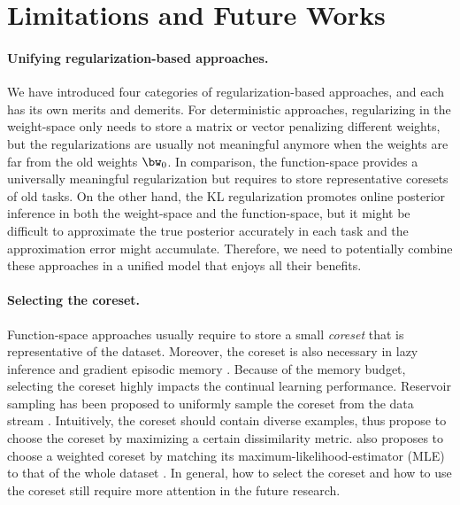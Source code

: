 \section{Limitations and Future Works}

\paragraph{Unifying regularization-based approaches.}
We have introduced four categories of regularization-based approaches, and each has its own merits and demerits. 
For deterministic approaches, regularizing in the weight-space only needs to store a matrix or vector penalizing different weights, but the regularizations are usually not meaningful anymore when the weights are far from the old weights $\bw_0$. In comparison, the function-space provides a universally meaningful regularization but requires to store representative coresets of old tasks. On the other hand, the KL regularization promotes online posterior inference in both the weight-space and the function-space, but it might be difficult to approximate the true posterior accurately in each task and the approximation error might accumulate. Therefore, we need to potentially combine these approaches in a unified model that enjoys all their benefits. 

\paragraph{Selecting the coreset.} Function-space approaches \citep{benjamin2018measuring, buzzega2020dark, rebuffi2017icarl} usually require to store a small \emph{coreset} that is representative of the dataset. Moreover, the coreset is also necessary in lazy inference \citep{nguyen2017variational} and gradient episodic memory \citep{lopez2017gradient, chaudhry2018efficient}. Because of the memory budget, selecting the coreset highly impacts the continual learning performance. Reservoir sampling has been proposed to uniformly sample the coreset from the data stream \citep{buzzega2020dark, chrysakis2020online}. Intuitively, the coreset should contain diverse examples, thus \citet{aljundi2019gradient, titsias2019functional} propose to choose the coreset by maximizing a certain dissimilarity metric. \citet{borsos2020coresets} also proposes to choose a weighted coreset by matching its maximum-likelihood-estimator (MLE) to that of the whole dataset \citep{campbell2019automated}. In general, how to select the coreset and how to use the coreset still require more attention in the future research.

